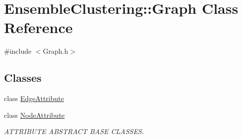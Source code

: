 \hypertarget{class_ensemble_clustering_1_1_graph}{\section{Ensemble\-Clustering\-:\-:Graph Class Reference}
\label{class_ensemble_clustering_1_1_graph}
}


{\ttfamily \#include $<$Graph.\-h$>$}

\subsection*{Classes}
\begin{DoxyCompactItemize}
\item 
class \hyperlink{class_ensemble_clustering_1_1_graph_1_1_edge_attribute}{Edge\-Attribute}
\item 
class \hyperlink{class_ensemble_clustering_1_1_graph_1_1_node_attribute}{Node\-Attribute}
\begin{DoxyCompactList}\small\item\em A\-T\-T\-R\-I\-B\-U\-T\-E A\-B\-S\-T\-R\-A\-C\-T B\-A\-S\-E C\-L\-A\-S\-S\-E\-S. \end{DoxyCompactList}\end{DoxyCompactItemize}
